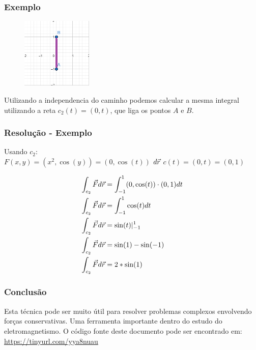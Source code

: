 \documentclass{beamer}
\def\vec{\mathaccent "017E\relax }
\begin{document}
\begin{frame}
    \frametitle{Exemplo} 

    \begin{figure} 
        \vspace{-35pt}
        \centering
        \caption{}
        \includegraphics[width=0.30\textwidth]{grafico-exemplo-2.png}
        \label{fig:grafico-exemplo1}
    \end{figure}

    Utilizando a independencia do caminho podemos calcular a mesma integral utilizando 
    a reta $ c_2(t) = ( 0, t) $, que liga os pontos $ A $ e $ B $.

\end{frame}

\begin{frame}
    \frametitle{Resolução - Exemplo} 
    Usando $ c_2 $: \\
    
    $ F(x, y) = ( x^2, \cos(y) ) = ( 0, \cos(t) ) $
    \hfill \break
    $ d\vec{r} $
    \hfill \break
    $ c(t) = ( 0, t ) = ( 0, 1 ) $
    \hfill \break
    
    \begin{align*}   
    \int_{c_2} \vec{F} d\vec{r} &= \int_{-1}^1 (0, \cos(t) ) \cdot ( 0, 1 ) dt \\
    \int_{c_2} \vec{F} d\vec{r} &= \int_{-1}^1 \cos(t) dt  \\
    \int_{c_2} \vec{F} d\vec{r} &= \sin(t)\vert_{-1}^{1} \\
    \int_{c_2} \vec{F} d\vec{r} &= \sin(1) - \sin(-1) \\
    \int_{c_2} \vec{F} d\vec{r} &= 2 * \sin(1) \\
    \end{align*}
    
\end{frame}

\begin{frame}
    \frametitle{Conclusão} 
    Esta técnica pode ser muito útil para resolver problemas complexos envolvendo forças conservativas. 
    Uma ferramenta importante dentro do estudo do eletromagnetismo.
    \hfill \break
    \hfill \break
    O código fonte deste documento pode ser encontrado em:
    \hfill \break
    \url{https://tinyurl.com/yya8nuau}

\end{frame}
\end{document}
